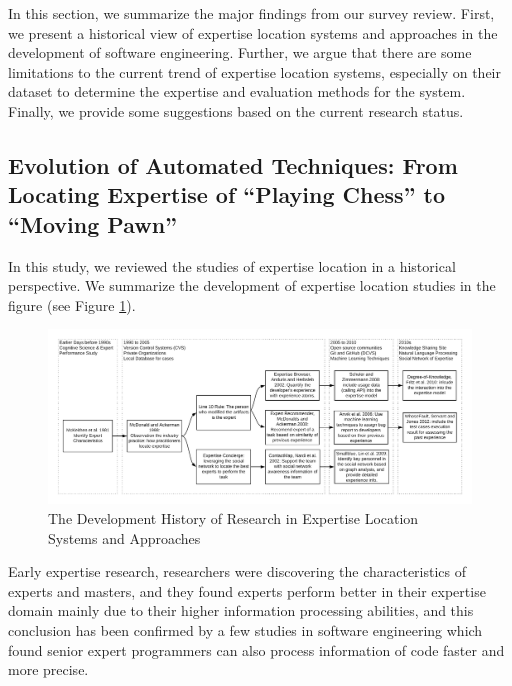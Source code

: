 In this section, we summarize the major findings from our survey review. First, we present a historical view of expertise location systems and approaches in the development of software engineering. Further, we argue that there are some limitations to the current trend of expertise location systems, especially on their dataset to determine the expertise and evaluation methods for the system. Finally, we provide some suggestions based on the current research status.

\subsection{Evolution of Automated Techniques: From Locating Expertise of ``Playing Chess'' to ``Moving Pawn''}

In this study, we reviewed the studies of expertise location in a historical perspective. We summarize the development of expertise location studies in the figure (see Figure \ref{history}).

\begin{figure}
    \includegraphics[width=\textwidth]{History.png}
    \caption{The Development History of Research in Expertise Location Systems and Approaches}
    \label{history}
\end{figure}

Early expertise research, researchers were discovering the characteristics of experts and masters, and they found experts perform better in their expertise domain mainly due to their higher information processing abilities, and this conclusion has been confirmed by a few studies in software engineering which found senior expert programmers can also process information of code faster and more precise.

